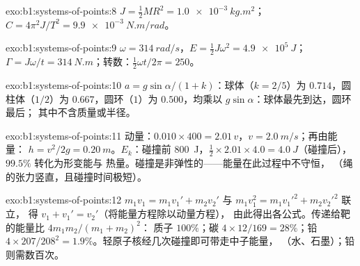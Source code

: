 \begin{solution}{exo:b1:systems-of-points:8}
$J = \tfrac12 MR^2 = \qty{1.0e-3}{kg.m^2}$；$C = 4\pi^2J/T^2 = \qty{9.9e-3}{N.m/rad}$。
\end{solution}

\begin{solution}{exo:b1:systems-of-points:9}
$\omega = \qty{314}{rad/s}$，$E = \tfrac12 J\omega^2 = \qty{4.9e5}{J}$；
$\Gamma = J\omega/t = \qty{314}{N.m}$；转数：$\tfrac12\omega t/2\pi = 250$。
\end{solution}

\begin{solution}{exo:b1:systems-of-points:10}
$a = g\sin\alpha/(1 + k)$：球体（$k = 2/5$）为 $0.714$，圆柱体（$1/2$）为
$0.667$，圆环（$1$）为 $0.500$，均乘以 $g\sin\alpha$：球体最先到达，圆环最后；
其中不含质量或半径。
\end{solution}

\begin{solution}{exo:b1:systems-of-points:11}
动量：$0.010 \times 400 = 2.01\,v$，$v = \qty{2.0}{m/s}$；再由能量：
$h = v^2/2g = \qty{0.20}{m}$。$E_k$：碰撞前 \qty{800}{J}，$\tfrac12 \times
2.01 \times 4.0 = \qty{4.0}{J}$（碰撞后），$99.5\%$ 转化为形变能与
热量。碰撞是非弹性的——能量在此过程中不守恒，
（绳的张力竖直，且碰撞时间极短）。
\end{solution}

\begin{solution}{exo:b1:systems-of-points:12}
$m_1v_1 = m_1v_1' + m_2v_2'$ 与 $m_1v_1^2 = m_1v_1'^2 + m_2v_2'^2$ 联立，
得 $v_1 + v_1' = v_2'$（将能量方程除以动量方程），
由此得出各公式。传递给靶的能量比 $4m_1m_2/(m_1 + m_2)^2$：
质子 $100\%$；碳 $4 \times 12/169 = 28\%$；铅 $4 \times 207/208^2 =
1.9\%$。轻原子核经几次碰撞即可带走中子能量，
（水、石墨）；铅则需数百次。
\end{solution}

